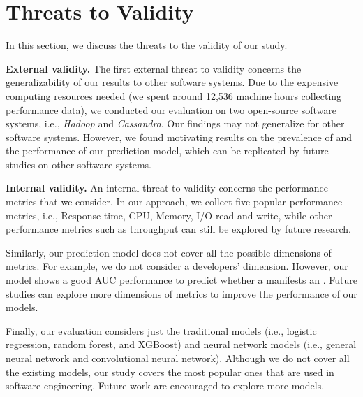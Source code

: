 
\section{Threats to Validity}
\label{sec:threats}
In this section, we discuss the threats to the validity of our study. 

\noindent \textbf{External validity.} The first external threat to validity concerns the generalizability of our results to other software systems. Due to the expensive computing resources needed (we spent around 12,536 machine hours collecting performance data), we conducted our evaluation on two open-source software systems, i.e., \emph{Hadoop} and \emph{Cassandra}. Our findings may not generalize for other software systems. %
However, we found motivating results on the prevalence of \inconsistent and the performance of our prediction model, which can be replicated by future studies on other software systems. %

\noindent \textbf{Internal validity.}
An internal threat to validity concerns the performance metrics that we consider. In our approach, we collect five popular performance metrics, i.e., Response time, CPU, Memory, I/O read and write, while other performance metrics such as throughput can still be explored by future research.%

Similarly, our prediction model does not cover all the possible dimensions of metrics. For example, we do not consider a developers' dimension. However, our model shows a good AUC performance to predict whether a \instance manifests an \inconsistent. Future studies can explore more dimensions of metrics to improve the performance of our models. 

Finally, our evaluation considers just the traditional models (i.e., logistic regression, random forest, and XGBoost) and neural network models (i.e., general neural network and convolutional neural network). Although we do not cover all the existing models, our study covers the most popular ones that are used in software engineering. Future work are encouraged to explore more models. 




